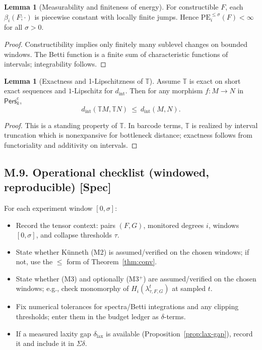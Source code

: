\documentclass[11pt]{article}
\numberwithin{equation}{section}
\theoremstyle{plain}
\theoremstyle{definition}
\theoremstyle{remark}
\newcommand{\TT}{\mathbb{T}}
\newcommand{\Pers}{\mathsf{Pers}}
\theoremstyle{plain}
\theoremstyle{definition}
\newcommand{\kk}{k}
\newcommand{\PE}{\mathrm{PE}}
\newcommand{\betti}{\beta}
\newcommand{\dint}{d_{\mathrm{int}}}
\numberwithin{equation}{section}
\newtheorem{lemma}[theorem]{Lemma}
\theoremstyle{definition}
\numberwithin{equation}{section}
\theoremstyle{plain}
\theoremstyle{definition}
\theoremstyle{remark}
\begin{document}
\begin{lemma}[Measurability and finiteness of energy]
For constructible \(F\), each \(\betti_i(F;\cdot)\) is piecewise constant with locally finite jumps. Hence \(\PE_i^{\le \sigma}(F)<\infty\) for all \(\sigma>0\).
\end{lemma}

\begin{proof}
Constructibility implies only finitely many sublevel changes on bounded windows. The Betti function is a finite sum of characteristic functions of intervals; integrability follows.
\end{proof}

\begin{lemma}[Exactness and 1-Lipschitzness of \(\TT\)]
Assume \(\TT\) is exact on short exact sequences and \(1\)-Lipschitz for \(\dint\). Then for any morphism \(f:M\to N\) in \(\Pers^\mathrm{c}_\kk\),
\[
  \dint(\TT M,\TT N)\ \le\ \dint(M,N).
\]
\end{lemma}

\begin{proof}
This is a standing property of \(\TT\). In barcode terms, \(\TT\) is realized by interval truncation which is nonexpansive for bottleneck distance; exactness follows from functoriality and additivity on intervals.
\end{proof}

\bigskip

\subsection*{M.9. Operational checklist (windowed, reproducible) [Spec]}

For each experiment window \([0,\sigma]\):
\begin{itemize}[leftmargin=2em]
  \item Record the tensor context: pairs \((F,G)\), monitored degrees \(i\), windows \([0,\sigma]\), and collapse thresholds \(\tau\).
  \item State whether K\"unneth (M2) is assumed/verified on the chosen windows; if not, use the \(\le\) form of Theorem~\ref{thm:conv}.
  \item State whether (M3) and optionally (M3$^+$) are assumed/verified on the chosen windows; e.g., check monomorphy of \(H_i(\lambda_{\tau,F,G}^t)\) at sampled \(t\).
  \item Fix numerical tolerances for spectra/Betti integrations and any clipping thresholds; enter them in the budget ledger as \(\delta\)-terms.
  \item If a measured laxity gap \(\delta_{\mathrm{lax}}\) is available (Proposition~\ref{prop:lax-gap}), record it and include it in \(\Sigma\delta\).
\end{itemize}
\end{document}
